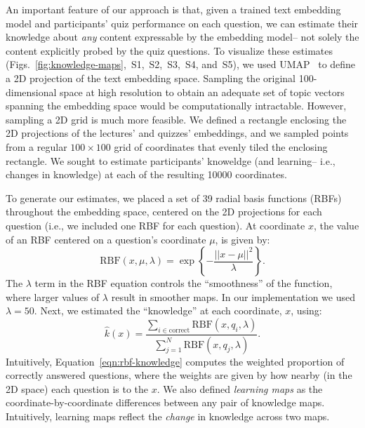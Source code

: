 \documentclass[10pt]{article}
\newcommand{\individualKnowledgeMapsA}{S1}
\newcommand{\individualKnowledgeMapsB}{S2}
\newcommand{\individualKnowledgeMapsC}{S3}
\newcommand{\individualLearningMapsA}{S4}
\newcommand{\individualLearningMapsB}{S5}
\begin{document}
An important feature of our approach is that, given a trained text embedding
model and participants' quiz performance on each question, we can estimate
their knowledge about \textit{any} content expressable by the embedding model--
not solely the content explicitly probed by the quiz questions. To visualize
these estimates
(Figs.~\ref{fig:knowledge-maps},~\individualKnowledgeMapsA,~\individualKnowledgeMapsB,~\individualKnowledgeMapsC,~\individualLearningMapsA,
and~\individualLearningMapsB), we used UMAP~\citep{McInEtal18a} to define a 2D
projection of the text embedding space. Sampling the original 100-dimensional
space at high resolution to obtain an adequate set of topic vectors spanning
the embedding space would be computationally intractable. However, sampling a
2D grid is much more feasible. We defined a rectangle enclosing the 2D
projections of the lectures' and quizzes' embeddings, and we sampled points
from a regular $100 \times 100$ grid of coordinates that evenly tiled the
enclosing rectangle. We sought to estimate participants' knoweldge (and
learning-- i.e., changes in knowledge) at each of the resulting 10000
coordinates.

To generate our estimates, we placed a set of 39 radial basis functions (RBFs)
throughout the embedding space, centered on the 2D projections for each
question (i.e., we included one RBF for each question). At coordinate $x$, the
value of an RBF centered on a question's coordinate $\mu$, is given by:
\begin{equation}
    \mathrm{RBF}(x, \mu, \lambda) = \exp\left\{-\frac{||x - \mu||^2}{\lambda}\right\}.
    \label{eqn:rbf}
\end{equation}
The $\lambda$ term in the RBF equation controls the ``smoothness'' of the
function, where larger values of $\lambda$ result in smoother maps. In our
implementation we used $\lambda = 50$.  Next, we estimated the ``knowledge''
at each coordinate, $x$, using:
\begin{equation}
    \hat{k}(x) = \frac{\sum_{i \in \mathrm{correct}} \mathrm{RBF}(x, q_i, \lambda)}{\sum_{j = 1}^N \mathrm{RBF}(x, q_j, \lambda)}.
    \label{eqn:rbf-knowledge}
\end{equation}
Intuitively, Equation~\ref{eqn:rbf-knowledge} computes the weighted proportion of
correctly answered questions, where the weights are given by how nearby (in the 2D space)
each question is to the $x$.  We also defined \textit{learning maps} as the coordinate-by-coordinate
differences between any pair of knowledge maps.  Intuitively, learning maps reflect the \textit{change}
in knowledge across two maps.




\end{document}
